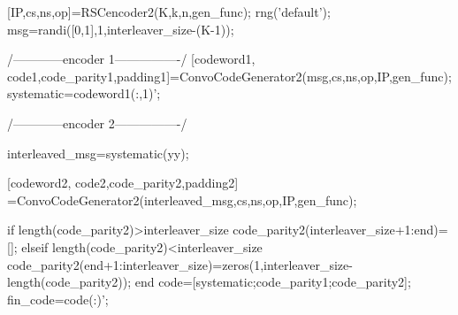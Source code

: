 \documentclass[20 pts]{article}
\begin{document}
[IP,cs,ns,op]=RSCencoder2(K,k,n,gen_func);
rng('default');
 msg=randi([0,1],1,interleaver_size-(K-1));

/------------encoder 1----------------/
[codeword1, code1,code_parity1,padding1]=ConvoCodeGenerator2(msg,cs,ns,op,IP,gen_func);
systematic=codeword1(:,1)';
  
/------------encoder 2----------------/

interleaved_msg=systematic(yy);

[codeword2, code2,code_parity2,padding2] =ConvoCodeGenerator2(interleaved_msg,cs,ns,op,IP,gen_func);

 if length(code_parity2)>interleaver_size
     code_parity2(interleaver_size+1:end)=[];
elseif length(code_parity2)<interleaver_size  code_parity2(end+1:interleaver_size)=zeros(1,interleaver_size-length(code_parity2));
 end
code=[systematic;code_parity1;code_parity2];
fin_code=code(:)';
\end{document}
